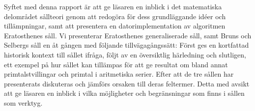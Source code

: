 Syftet med denna rapport är att ge läsaren en inblick i det matematiska delområdet sållteori genom att redogöra för dess grundläggande idéer och tillämpningar, samt att presentera en datorimplementation av algoritmen Eratosthenes såll.
%
Vi presenterar Eratosthenes generaliserade såll, samt Bruns och Selbergs såll en åt gången med följande tillvägagångssätt:
Först ges en kortfattad historisk kontext till sållet ifråga, följt av en översiktlig härledning och slutligen, ett exempel på hur sållet kan tillämpas för att ge resultat om bland annat primtalstvillingar och primtal i aritmetiska serier.
%
Efter att de tre sållen har presenterats diskuteras och jämförs orsaken till deras feltermer.
Detta med avsikt att ge läsaren en inblick i vilka möjligheter och begränsningar som finns i sållen som verktyg.
%






%
